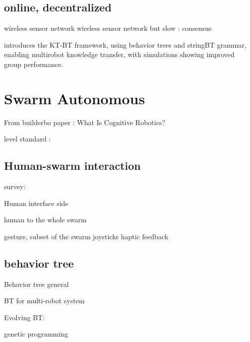 \subsection {online, decentralized}
\cite{xie2011design} wireless sensor network
\cite{wang2006reprogramming} wireless sensor network
but slow : consensus
\cite{de2009energy}
\cite{varadharajan2018over} 



\cite{venkata2023kt} introduces the KT-BT framework, using behavior trees and stringBT grammar, enabling multirobot knowledge transfer, with simulations showing improved group performance.


\section{Swarm Autonomous}

From builderbo paper :
What Is Cognitive Robotics?
\cite{cangelosi2022cognition} 
\cite{vernon2014artificial} 
\cite{heinrich2022swarm}
\cite{khaluf2019neglected}

level standard :
\cite{sae2021automated}


\subsection{Human-swarm interaction}

survey:
\cite{siean2023opportunities}
\cite{kolling2015human}

Human interface side
\cite{jarvis2025first}
\cite{abioye2025user}
\cite{alonso2015gesture}

human to the whole swarm
\cite{ayanian2014controlling}
\cite{alonso2015gesture}
\cite{macchini2021personalized}

\cite{podevijn2013gesturing} gesture, subset of the swarm
\cite{zhou2016assistive} joysticks
\cite{lee2013semiautonomous} haptic feedback

\cite{kolling2013human}


\subsection{behavior tree}

Behavior tree general
\cite{colledanchise2018behavior}
\cite{iovino2022survey}

BT for multi-robot system
\cite{colledanchise2016advantages}
\cite{jeong2022behavior}

Evolving BT:

genetic programming
\cite{jones2018evolving}
\cite{kuckling2022automode}

